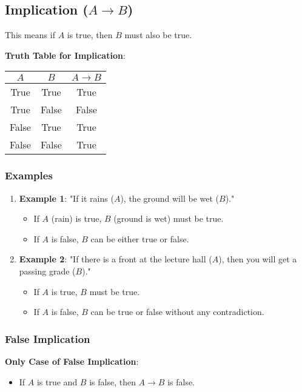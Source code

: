 \documentclass{article}
\begin{document}
\subsection{Implication ($A \rightarrow B$)}
This means if $A$ is true, then $B$ must also be true.

\textbf{Truth Table for Implication}:
\begin{center}
    \begin{tabular}{|c|c|c|}
        \hline
        $A$ & $B$ & $A \rightarrow B$ \\
        \hline
        True & True & True \\
        True & False & False \\
        False & True & True \\
        False & False & True \\
        \hline
    \end{tabular}
\end{center}

\subsubsection{Examples}
\begin{enumerate}
    \item \textbf{Example 1}: "If it rains ($A$), the ground will be wet ($B$)."
    \begin{itemize}
        \item If $A$ (rain) is true, $B$ (ground is wet) must be true.
        \item If $A$ is false, $B$ can be either true or false.
    \end{itemize}
    
    \item \textbf{Example 2}: "If there is a front at the lecture hall ($A$), then you will get a passing grade ($B$)."
    \begin{itemize}
        \item If $A$ is true, $B$ must be true.
        \item If $A$ is false, $B$ can be true or false without any contradiction.
    \end{itemize}
\end{enumerate}

\subsubsection{False Implication}
\textbf{Only Case of False Implication}:
\begin{itemize}
    \item If $A$ is true and $B$ is false, then $A \rightarrow B$ is false.
\end{itemize}
\end{document}

